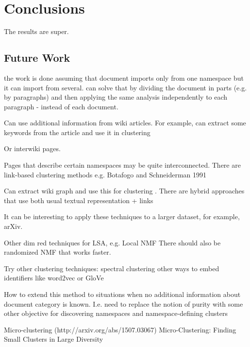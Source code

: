 \section{Conclusions}

The results are super.


\subsection{Future Work}





the work is done assuming that document imports only from one namespace
but it can import from several. can solve that by dividing the document
in parts (e.g. by paragraphs) and then applying the same analysis
independently to each paragraph - instead of each document.


Can use additional information from wiki articles. For example, can
extract some keywords from the article and use it in clustering

Or interwiki pages.

Pages that describe certain namespaces may be quite interconnected.
There are link-based clustering methods e.g. Botafogo and Schneiderman 1991

Can extract wiki graph and use this for clustering .
There are hybrid approaches that use both usual textual representation  + links
\cite{oikonomakou2005review}


It can be interesting to apply these techniques to a larger dataset, for example, arXiv.

Other dim red techniques for LSA, e.g. Local NMF \cite{li2001learning}
There should also be randomized NMF that works faster.


Try other clustering techniques: spectral clustering \cite{ng2002spectral}
other ways to embed identifiers like word2vec \cite{mikolov2013efficient}
or GloVe \cite{pennington2014glove}


How to extend this method to situations when no additional information
about document category is known. I.e. need to replace the notion of
purity with some other objective for discovering namespaces and
namespace-defining clusters


Micro-clustering (http://arxiv.org/abs/1507.03067)
Micro-Clustering: Finding Small Clusters in Large Diversity




